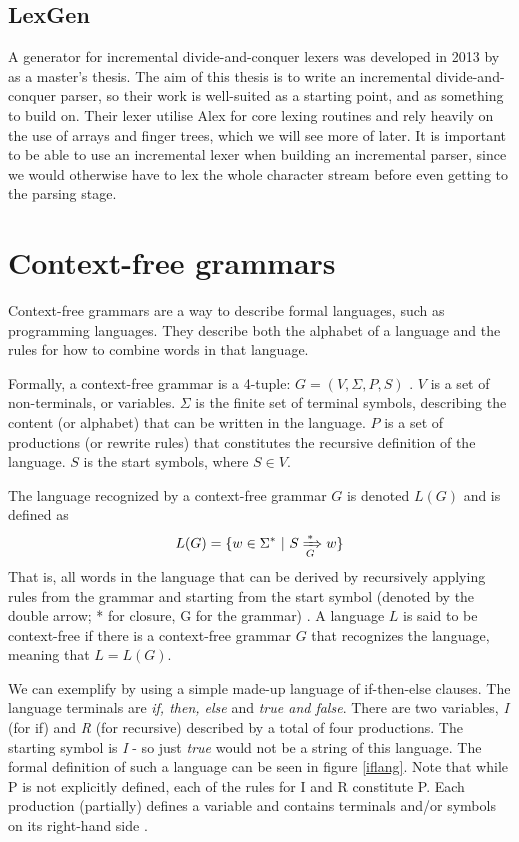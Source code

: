 \documentclass[a4paper,12pt,twosided]{report}
\renewcommand\cite{\citep}
\begin{document}
\subsection{LexGen}
A generator for incremental divide-and-conquer lexers was developed in 2013 by
\citet{divconqlex} as a master's thesis. The aim of this thesis is to write an
incremental divide-and-conquer parser, so their work is well-suited as a
starting point, and as something to build on. Their lexer utilise Alex for core
lexing routines and rely heavily on the use of arrays and finger trees, which
we will see more of later. It is important to be able to use an incremental
lexer when building an incremental parser, since we would otherwise have to lex
the whole character stream before even getting to the parsing stage.

\section{Context-free grammars}
Context-free grammars are a way to describe formal languages, such as
programming languages. They describe both the alphabet of a language and the
rules for how to combine words in that language.

Formally, a context-free grammar is a 4-tuple: $G = (V, \Sigma, P, S)$
\cite[p.171]{automatabook}. $V$ is a set of non-terminals, or variables. $\Sigma$ is
the finite set of terminal symbols, describing the content (or alphabet) that
can be written in the language. $P$ is a set of productions (or rewrite rules)
that constitutes the recursive definition of the language. $S$ is the start
symbols, where $S \in V$. 

The language recognized by a context-free grammar $G$ is denoted $L(G)$ and is
defined as 
\[
L(G) = \{w \in \Sigma^* \ |\  S \xRightarrow[G]{*} w\}
\]
That is, all words in the language that can be derived by recursively applying
rules from the grammar and starting from the start symbol (denoted by the double
arrow; * for closure, G for the grammar) \cite[p.  177]{automatabook}. A
language $L$ is said to be context-free if there is a context-free grammar $G$
that recognizes the language, meaning that $L = L(G)$.

We can exemplify by using a simple made-up language of if-then-else clauses.
The language terminals are \textit{if, then, else} and \textit{true and false}.
There are two variables, \textit{I} (for if) and \textit{R} (for recursive)
described by a total of four productions. The starting symbol is \textit{I} - so
just \textit{true} would not be a string of this language. The formal
definition of such a language can be seen in figure \ref{iflang}. Note that
while P is not explicitly defined, each of the rules for I and R constitute P.
Each production (partially) defines a variable and contains terminals and/or
symbols on its right-hand side \cite[p.171]{automatabook}.
\end{document}
